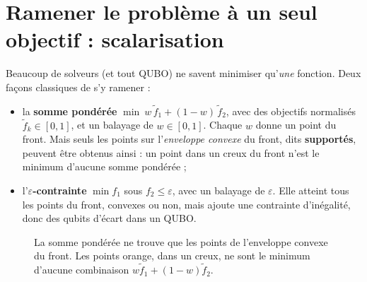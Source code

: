 \section{Ramener le problème à un seul objectif : scalarisation}
Beaucoup de solveurs (et tout QUBO) ne savent minimiser qu'\emph{une} fonction. Deux façons classiques de s'y ramener :
\begin{itemize}
\item la \textbf{somme pondérée} $\min\ w\,\tilde f_1+(1-w)\,\tilde f_2$, avec des objectifs normalisés $\tilde f_k\in[0,1]$, et un balayage de $w\in[0,1]$. Chaque $w$ donne un point du front. Mais seuls les points sur l'\emph{enveloppe convexe} du front, dits \textbf{supportés}, peuvent être obtenus ainsi : un point dans un creux du front n'est le minimum d'aucune somme pondérée ;
\item l'\textbf{$\varepsilon$-contrainte} $\min f_1$ sous $f_2\le\varepsilon$, avec un balayage de $\varepsilon$. Elle atteint tous les points du front, convexes ou non, mais ajoute une contrainte d'inégalité, donc des qubits d'écart dans un QUBO.
\end{itemize}

\begin{figure}[htbp]
\centering
{}
\caption{La somme pondérée ne trouve que les points de l'enveloppe convexe du front. Les points orange, dans un creux, ne sont le minimum d'aucune combinaison $w\tilde f_1+(1-w)\tilde f_2$.}\label{fig:convexe}
\end{figure}

